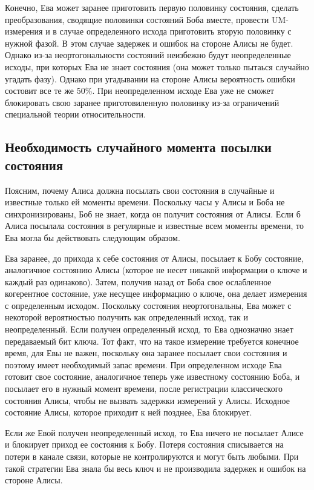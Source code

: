 Конечно, Ева может заранее приготовить первую половинку состояния, сделать преобразования, сводящие половинки состояний Боба вместе, провести UM-измерения и в случае определенного исхода приготовить вторую половинку с нужной фазой. В этом случае задержек и ошибок на стороне Алисы не будет. Однако из-за неортогональности состояний неизбежно будут неопределенные исходы, при которых Ева не знает состояния (она может только пытаься случайно угадать фазу). Однако при угадывании на стороне Алисы вероятность ошибки состовит все те же 50\%. При неопределенном исходе Ева уже не сможет блокировать свою заранее приготовиленную половинку из-за ограничений специальной теории относительности.

\subsection{Необходимость случайного момента посылки состояния}
Поясним, почему Алиса должна посылать свои состояния в случайные и известные только ей моменты времени. Поскольку часы у Алисы и Боба не синхронизированы, Боб не знает, когда он получит состояния от Алисы. Если б Алиса посылала состояния в регулярные и известные всем моменты времени, то Ева могла бы действовать следующим образом.

Ева заранее, до прихода к себе состояния от Алисы, посылает к Бобу состояние, аналогичное состоянию Алисы (которое не несет никакой информации о ключе и каждый раз одинаково). 
Затем, получив назад от Боба свое ослабленное когерентное состояние, уже несущее информацию о ключе, она делает измерения с определенным исходом. 
Поскольку состояния неортогональны, Ева может с некоторой вероятностью получить как определенный исход, так и неопределенный. 
Если получен определенный исход, то Ева однозначно знает передаваемый бит ключа. 
Тот факт, что на такое измерение требуется конечное время, для Евы не важен, поскольку она заранее посылает свои состояния и поэтому имеет необходимый запас времени. 
При определенном исходе Ева готовит свое состояние, аналогичное теперь уже известному состоянию Боба, и посылает его в нужный момент времени, после регистрации классического состояния Алисы, чтобы не вызвать задержки измерений у Алисы. 
Исходное состояние Алисы, которое приходит к ней позднее, Ева блокирует.

Если же Евой получен неопределенный исход, то Ева ничего не посылает Алисе и блокирует приход ее состояния к Бобу. 
Потеря состояния списывается на потери в канале связи, которые не контролируются и могут быть любыми. 
При такой стратегии Ева знала бы весь ключ и не производила задержек и ошибок на стороне Алисы.

